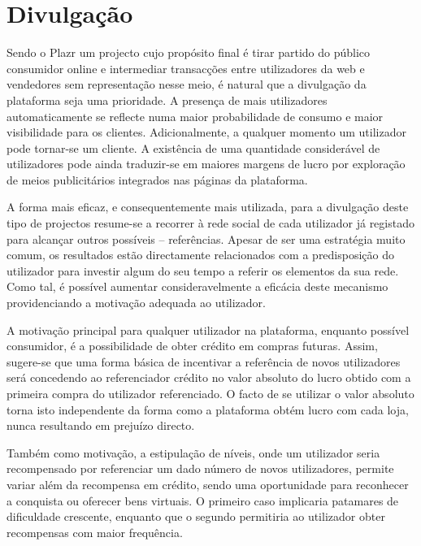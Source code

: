 \section{Divulgação}
Sendo o Plazr um projecto cujo propósito final é tirar partido do público consumidor online e intermediar transacções entre utilizadores da web e vendedores sem representação nesse meio, é natural que a divulgação da plataforma seja uma prioridade.
A presença de mais utilizadores automaticamente se reflecte numa maior probabilidade de consumo e maior visibilidade para os clientes.
Adicionalmente, a qualquer momento um utilizador pode tornar-se um cliente.
A existência de uma quantidade considerável de utilizadores pode ainda traduzir-se em maiores margens de lucro por exploração de meios publicitários integrados nas páginas da plataforma.

A forma mais eficaz, e consequentemente mais utilizada, para a divulgação deste tipo de projectos resume-se a recorrer à rede social de cada utilizador já registado para alcançar outros possíveis -- referências.
Apesar de ser uma estratégia muito comum, os resultados estão directamente relacionados com a predisposição do utilizador para investir algum do seu tempo a referir os elementos da sua rede.
Como tal, é possível aumentar consideravelmente a eficácia deste mecanismo providenciando a motivação adequada ao utilizador.

A motivação principal para qualquer utilizador na plataforma, enquanto possível consumidor, é a possibilidade de obter crédito em compras futuras. Assim, sugere-se que uma forma básica de incentivar a referência de novos utilizadores será concedendo ao referenciador crédito no valor absoluto do lucro obtido com a primeira compra do utilizador referenciado. O facto de se utilizar o valor absoluto torna isto independente da forma como a plataforma obtém lucro com cada loja, nunca resultando em prejuízo directo.

Também como motivação, a estipulação de níveis, onde um utilizador seria recompensado por referenciar um dado número de novos utilizadores, permite variar além da recompensa em crédito, sendo uma oportunidade para reconhecer a conquista ou oferecer bens virtuais. O primeiro caso implicaria patamares de dificuldade crescente, enquanto que o segundo permitiria ao utilizador obter recompensas com maior frequência.
